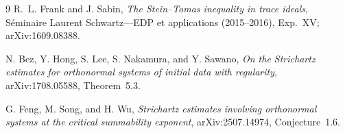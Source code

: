 \documentclass[11pt]{article}
\begin{document}
\begin{thebibliography}{9}
R.~L. Frank and J. Sabin,
\emph{The Stein--Tomas inequality in trace ideals},
S\'eminaire Laurent Schwartz---EDP et applications (2015--2016), Exp.~XV;
arXiv:1609.08388.

N. Bez, Y. Hong, S. Lee, S. Nakamura, and Y. Sawano,
\emph{On the Strichartz estimates for orthonormal systems of initial data with
regularity}, arXiv:1708.05588, Theorem~5.3.

G. Feng, M. Song, and H. Wu,
\emph{Strichartz estimates involving orthonormal systems at the critical
summability exponent}, arXiv:2507.14974, Conjecture~1.6.
\end{thebibliography}
\end{document}
